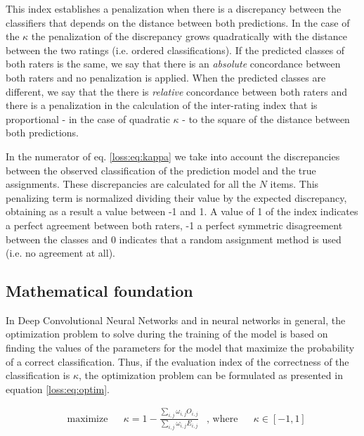 This index establishes a penalization when there is a discrepancy between the classifiers that depends on the distance between both predictions. In the case of the $\kappa$ the penalization of the discrepancy grows quadratically with the distance between the two ratings (i.e. ordered classifications). If the predicted classes of both raters is the same, we say that there is an \emph{absolute} concordance between both raters and no penalization is applied. When the predicted classes are different, we say that the there is \emph{relative} concordance between both raters and there is a penalization in the calculation of the inter-rating index that is proportional - in the case of quadratic $\kappa$ - to the square of the distance between both predictions. 

In the numerator of eq. \ref{loss:eq:kappa} we take into account the discrepancies between the observed classification of the prediction model and the true assignments. These discrepancies are calculated for all the $N$ items. This penalizing term is normalized dividing their value by the expected  discrepancy, obtaining as a result a value between -1 and 1. A value of 1 of the index indicates a perfect agreement between both raters, -1 a perfect symmetric disagreement between the classes and 0 indicates that a random assignment method is used (i.e. no agreement at all). 

\subsection{Mathematical foundation}

In Deep Convolutional Neural Networks and in neural networks in general, the optimization problem to solve during the training of the model is based on finding the values of the parameters for the model that maximize the probability of a correct classification. Thus, if the evaluation index of the correctness of the classification is $\kappa$, the optimization problem can be formulated as presented in equation \ref{loss:eq:optim}.

\begin{equation}
\label{loss:eq:optim}
\begin{aligned}
& \underset{}{\text{maximize}}
& & \kappa = 1 - \frac{ \sum_{i,j} \omega_{i,j} O_{i,j} }
{\sum_{i,j} \omega_{i,j} E_{i,j}} & \text{, where} & & \kappa \in [-1,1]\\
\end{aligned}
\end{equation}


